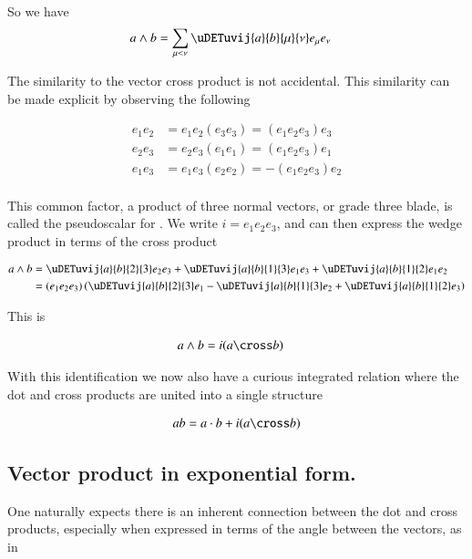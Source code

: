 So we have
\begin{align}
a \wedge b
&= \sum_{\mu < \nu} \uDETuvij{a}{b}{\mu}{\nu} e_\mu e_\nu 
\end{align}

The similarity to the  vector cross product is not accidental.  This similarity can be made explicit by observing the following

\begin{align*}
e_1 e_2 &= e_1 e_2 (e_3 e_3) = (e_1 e_2 e_3) e_3 \\
e_2 e_3 &= e_2 e_3 (e_1 e_1) = (e_1 e_2 e_3) e_1 \\
e_1 e_3 &= e_1 e_3 (e_2 e_2) = -(e_1 e_2 e_3) e_2 \\
\end{align*}

This common factor, a product of three normal vectors, or grade three blade, is called the pseudoscalar for .  We write
$i = e_1 e_2 e_3$, and can then express the  wedge product in terms of the cross product

\begin{align*}
a \wedge b
&= 
\uDETuvij{a}{b}{2}{3} e_2 e_3 
+\uDETuvij{a}{b}{1}{3} e_1 e_3 
+\uDETuvij{a}{b}{1}{2} e_1 e_2  \\
&= 
(e_1 e_2 e_3) \left( \uDETuvij{a}{b}{2}{3} e_1 
-\uDETuvij{a}{b}{1}{3} e_2 
+\uDETuvij{a}{b}{1}{2} e_3 \right) \\
\end{align*}

This is

\begin{align}\label{eqn:intro_ga:wedgeAsCross}
a \wedge b &= i (a \cross b)
\end{align}

With this identification we now also have a curious integrated relation where the dot and cross products are united into
a single structure

\begin{align}\label{eqn:intro_ga:scalarPlusIcross}
a b = a \cdot b + i (a \cross b)
\end{align}

\subsection{Vector product in exponential form. }

One naturally expects there is an inherent connection between the dot and cross products, especially when expressed in terms of
the angle between the vectors, as in

